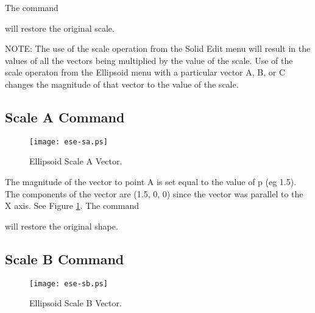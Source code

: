 The command


will restore the original scale.

NOTE:
The use
of the scale operation from the Solid Edit menu
will result in the values of all the vectors being
multiplied by the value of the scale.
Use of the scale operaton from the Ellipsoid menu
with a particular vector A, B, or C changes the
magnitude of that vector to the value of the scale.

\subsection{Scale A Command}

\begin{figure}
\centering \texttt{[image: ese-sa.ps]}
\caption{Ellipsoid Scale A Vector.}
\label{ese-sa}
\end{figure}


The magnitude of the vector to point A is set equal to the value of p
(eg 1.5).
The components of the vector are (1.5, 0, 0) since the vector was
parallel to the X axis.  See Figure \ref{ese-sa}.  The command


will restore the original shape.

\subsection{Scale B Command}

\begin{figure}
\centering \texttt{[image: ese-sb.ps]}
\caption{Ellipsoid Scale B Vector.}
\label{ese-sb}
\end{figure}


